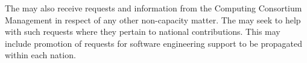 \documentclass[../main-v1.tex]{subfiles}
\begin{document}
The  may also receive requests and information from the Computing Consortium Management in respect of any other non-capacity matter. The  may seek to help with such requests where they pertain to national contributions. This may include promotion of requests for software engineering support to be propagated within each nation.




\end{document}

